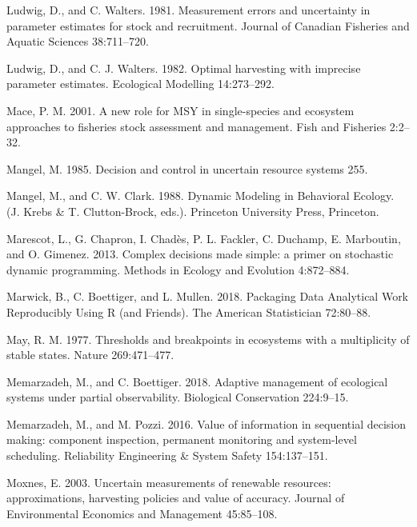 \documentclass[3p]{elsarticle} %
\begin{document}
\leavevmode\hypertarget{ref-Ludwig1981}{}%
Ludwig, D., and C. Walters. 1981. Measurement errors and uncertainty in
parameter estimates for stock and recruitment. Journal of Canadian
Fisheries and Aquatic Sciences 38:711--720.

\leavevmode\hypertarget{ref-Ludwig1982}{}%
Ludwig, D., and C. J. Walters. 1982. Optimal harvesting with imprecise
parameter estimates. Ecological Modelling 14:273--292.

\leavevmode\hypertarget{ref-Mace2001}{}%
Mace, P. M. 2001. A new role for MSY in single-species and ecosystem
approaches to fisheries stock assessment and management. Fish and
Fisheries 2:2--32.

\leavevmode\hypertarget{ref-Mangel1985}{}%
Mangel, M. 1985. Decision and control in uncertain resource systems 255.

\leavevmode\hypertarget{ref-Mangel1988}{}%
Mangel, M., and C. W. Clark. 1988. Dynamic Modeling in Behavioral
Ecology. (J. Krebs \& T. Clutton-Brock, eds.). Princeton University
Press, Princeton.

\leavevmode\hypertarget{ref-Marescot2013}{}%
Marescot, L., G. Chapron, I. Chadès, P. L. Fackler, C. Duchamp, E.
Marboutin, and O. Gimenez. 2013. Complex decisions made simple: a primer
on stochastic dynamic programming. Methods in Ecology and Evolution
4:872--884.

\leavevmode\hypertarget{ref-Marwick2018}{}%
Marwick, B., C. Boettiger, and L. Mullen. 2018. Packaging Data
Analytical Work Reproducibly Using R (and Friends). The American
Statistician 72:80--88.

\leavevmode\hypertarget{ref-May1977}{}%
May, R. M. 1977. Thresholds and breakpoints in ecosystems with a
multiplicity of stable states. Nature 269:471--477.

\leavevmode\hypertarget{ref-Memarzadeh2018}{}%
Memarzadeh, M., and C. Boettiger. 2018. Adaptive management of
ecological systems under partial observability. Biological Conservation
224:9--15.

\leavevmode\hypertarget{ref-Memarzadeh2016b}{}%
Memarzadeh, M., and M. Pozzi. 2016. Value of information in sequential
decision making: component inspection, permanent monitoring and
system-level scheduling. Reliability Engineering \& System Safety
154:137--151.

\leavevmode\hypertarget{ref-Moxnes2003}{}%
Moxnes, E. 2003. Uncertain measurements of renewable resources:
approximations, harvesting policies and value of accuracy. Journal of
Environmental Economics and Management 45:85--108.
\end{document}
